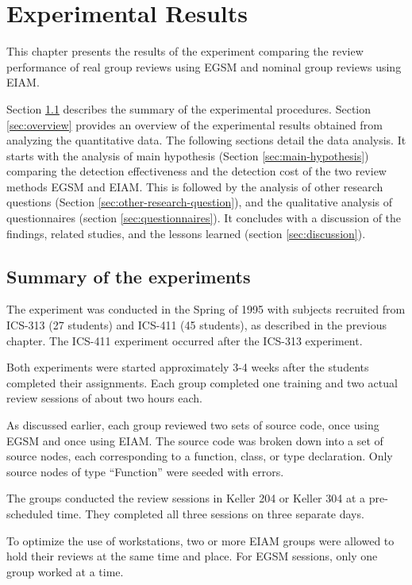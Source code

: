 \chapter {Experimental Results}
\label{ch:results}
This chapter presents the results of the experiment comparing the
review performance of real group reviews using EGSM and nominal
group reviews using EIAM.  

Section \ref{sec:summary} describes the summary of the experimental
procedures. Section \ref{sec:overview}
provides an overview of the experimental results obtained from
analyzing the quantitative data.
The following sections detail the data analysis. It starts
with the analysis of main hypothesis (Section 
\ref{sec:main-hypothesis}) comparing the detection effectiveness and
the detection cost of the two review methods EGSM and EIAM. This is
followed by the analysis of other research questions (Section
\ref{sec:other-research-question}), and the qualitative analysis of
questionnaires (section \ref{sec:questionnaires}). 
It concludes with a discussion of the
findings, related studies, and the lessons learned (section
\ref{sec:discussion}). 


\section {Summary of the experiments}
\label{sec:summary}

The experiment was conducted in the Spring of 1995 with subjects
recruited from ICS-313 (27 students) and ICS-411 (45 students), as
described in the previous chapter.
The ICS-411 experiment occurred after the ICS-313 experiment.

Both experiments were started approximately 3-4 weeks after the students
completed their assignments.
Each group completed one training and two actual review
sessions of about two hours each. 

As discussed earlier, each group reviewed two sets of source code,
once using EGSM and once using EIAM. The source code was broken down
into a set of source nodes, each corresponding to a function, class,
or type declaration. Only source nodes of type ``Function'' were
seeded with errors. 

The groups conducted the review sessions
in Keller 204 or Keller 304 at a pre-scheduled time. They
completed all three sessions on three separate days.

To optimize the use of workstations, two or
more EIAM groups were allowed to hold their reviews at the same time
and  place. For EGSM sessions, only one group worked at a time.

